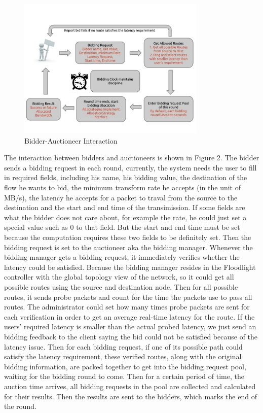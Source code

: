 \documentclass[a4paper,11pt,twocolumn]{article}
\begin{document}
\begin{figure}[ht!]
\centering
\includegraphics[width=90mm]{flow.jpg}
\caption{Bidder-Auctioneer Interaction}
\label{overflow}
\end{figure}
The interaction between bidders and auctioneers is shown in Figure 2. The bidder sends a bidding request in each round, currently, the 
system needs the user to fill in required fields, including his name, his bidding value, the destination of the flow he wants to bid,
the minimum transform rate he accepts (in the unit of MB/s), the latency he accepts for a packet to 
traval from the source to the destination and the start and end time of the transimission. If 
some fields are what the bidder does not care about, for example the rate, he could just set a special value such as 0 to that field. But 
the start and end time must be set because the computation requires these two fields to be definitely set. Then the bidding request is set 
to the auctioneer aka the bidding manager. Whenever the bidding manager gets a bidding request, it immediately verifies whether the latency
could be satisfied. Because the bidding manager resides in the Floodlight controller with the global topology view of the network, so it could
get all possible routes using the source and destination node. Then for all possible routes, it sends probe packets and count for the time the 
packets use to pass all routes. The administrator could set how many times probe packets are sent for each verification in order to get an 
average real-time latency for the route. If the users' required latency is smaller than the actual probed latency, we just send an bidding 
feedback to the client saying the bid could not be satisfied because of the latency issue. Then for each bidding request, if one of its possible
path could satisfy the latency requirement, these verified routes, along with the original bidding information, are packed together to get into
the bidding request pool, waiting for the bidding round to come. Then for a certain period of time, the auction time arrives, all bidding requests
in the pool are collected and calculated for their results. Then the results are sent to the bidders, which marks the end of the round.
\end{document}
